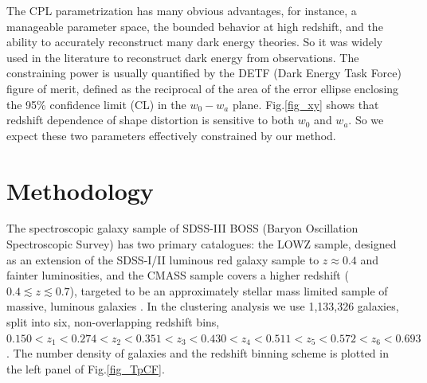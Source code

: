 \documentclass[iop]{emulateapj}
\begin{document}
The CPL parametrization has many obvious advantages, for instance, a manageable parameter space, 
the bounded behavior at high redshift, 
and the ability to accurately reconstruct many dark energy theories\cite{CPL_L}. 
So it was widely used in the literature to reconstruct dark energy from observations.
The constraining power is usually quantified by the DETF (Dark Energy Task Force) \cite{DETF} figure of merit, 
defined as the reciprocal of the area of the error ellipse enclosing the 95\% confidence limit (CL) in the $w_0-w_a$ plane. 
Fig.\ref{fig_xy} shows that redshift dependence of shape distortion is sensitive to both $w_0$ and $w_a$.
So we expect these two parameters effectively constrained by our method.




\section{Methodology}
The spectroscopic galaxy sample of SDSS-III BOSS (Baryon Oscillation Spectroscopic Survey) has two primary catalogues:
the LOWZ sample, designed as an extension of the SDSS-I/II luminous red galaxy sample to $z\approx 0.4$ and fainter luminosities,
and the CMASS sample covers a higher redshift ($0.4\lesssim z \lesssim 0.7$),
targeted to be an approximately stellar mass limited sample of massive, luminous galaxies \cite{Reidetal:2016}.
In the clustering analysis we use 1,133,326 galaxies, split into six, non-overlapping redshift bins, 
$0.150<z_1<0.274<z_2<0.351<z_3<0.430<z_4<0.511<z_5<0.572<z_6<0.693$.
The number density of galaxies and the redshift binning scheme is plotted in the left panel of Fig.\ref{fig_TpCF}.
\end{document}
